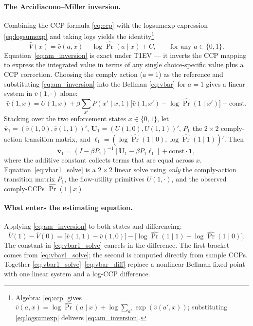 \paragraph{The Arcidiacono--Miller inversion.}
Combining the CCP formula \eqref{eq:ccp} with the logsumexp expression
\eqref{eq:logsumexp} and taking logs yields the identity\footnote{Algebra:
\eqref{eq:ccp} gives $\bar v(a, x) =
\log \hat\Pr(a \mid x) + \log \sum_{a'} \exp(\bar v(a', x))$;
substituting \eqref{eq:logsumexp} delivers \eqref{eq:am_inversion}.}
\begin{equation}
\bar V(x) = \bar v(a, x) - \log \hat\Pr(a \mid x) + C,
\qquad \text{for any } a \in \{0, 1\}.
\label{eq:am_inversion}
\end{equation}
Equation~\eqref{eq:am_inversion} is exact under T1EV — it inverts the CCP
mapping to express the integrated value in terms of any single choice-specific
value plus a CCP correction. Choosing the comply action ($a = 1$) as the
reference and substituting \eqref{eq:am_inversion} into the Bellman
\eqref{eq:vbar} for $a = 1$ gives a linear system in $\bar v(1, \cdot)$ alone:
\begin{equation}
\bar v(1, x) = U(1, x) + \beta \sum_{x'} P(x' \mid x, 1)
\big[ \bar v(1, x') - \log \hat\Pr(1 \mid x') \big]
+ \text{const}.
\label{eq:vbar1_system}
\end{equation}
Stacking over the two enforcement states $x \in \{0, 1\}$, let
$\boldsymbol{\bar v}_1 = (\bar v(1, 0), \bar v(1, 1))'$,
$\boldsymbol{U}_1 = (U(1, 0), U(1, 1))'$, $P_1$ the $2 \times 2$ comply-action
transition matrix, and $\boldsymbol{\ell}_1 = (\log \hat\Pr(1 \mid 0),
\log \hat\Pr(1 \mid 1))'$. Then
\begin{equation}
\boldsymbol{\bar v}_1 = (I - \beta P_1)^{-1}
\left[ \boldsymbol{U}_1 - \beta P_1 \boldsymbol{\ell}_1 \right]
+ \text{const} \cdot \mathbf{1},
\label{eq:vbar1_solve}
\end{equation}
where the additive constant collects terms that are equal across $x$. Equation~\eqref{eq:vbar1_solve} is a $2 \times 2$ linear
solve using \emph{only} the comply-action transition matrix $P_1$, the
flow-utility primitives $U(1, \cdot)$, and the observed comply-CCPs
$\hat\Pr(1 \mid x)$.

\paragraph{What enters the estimating equation.} Applying
\eqref{eq:am_inversion} to both states and differencing:
\begin{equation}
\bar V(1) - \bar V(0) = \big[\bar v(1, 1) - \bar v(1, 0)\big]
- \big[\log \hat\Pr(1 \mid 1) - \log \hat\Pr(1 \mid 0)\big].
\label{eq:vbar_diff}
\end{equation}
The constant in \eqref{eq:vbar1_solve} cancels in the difference. The first
bracket comes from \eqref{eq:vbar1_solve}; the second is computed directly
from sample CCPs. Together \eqref{eq:vbar1_solve}--\eqref{eq:vbar_diff} replace
a nonlinear Bellman fixed point with one linear system and a log-CCP
difference.


